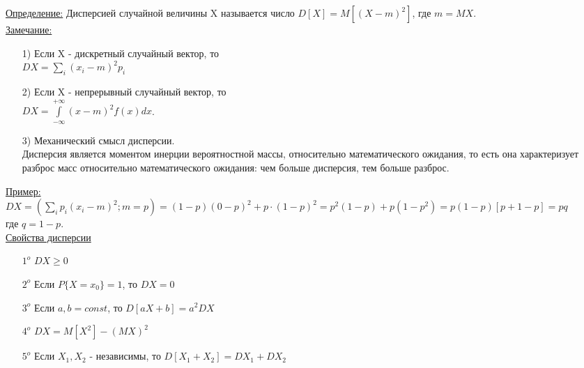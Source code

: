 

\underline{Определение:} Дисперсией случайной величины X называется число $D[X] = M\left[ (X-m)^2 \right]$, где $m = MX$.\\

\underline{Замечание:}
\begin{enumerate}
	\item[1)] Если X - дискретный случайный вектор, то\\
	$DX = \sum\limits_i (x_i - m)^2 p_i$
	
	\item[2)] Если X - непрерывный случайный вектор, то\\
	$\displaystyle  DX = \int\limits_{-\infty}^{+\infty} (x - m)^2 f(x) dx$.
	
	\item[3)] Механический смысл дисперсии.\\
	Дисперсия является моментом инерции вероятностной массы, относительно математического ожидания, то есть она характеризует разброс масс относительно математического ожидания: чем больше дисперсия, тем больше разброс.\\
\end{enumerate}


\underline{Пример:} \\
$DX = \left( \sum\limits_i p_i (x_i - m)^2; m = p\right) = (1 - p)(0 - p)^2 + p \cdot (1 - p)^2 = p^2 (1 - p) + p(1 - p^2) =  p(1 - p)[p + 1 - p] = pq$ \\
где $q = 1 - p$.\\


\underline{Свойства дисперсии}
\begin{enumerate}
	\item[$1^o$] $DX \geqslant 0$
	
	\item[$2^o$] Если $P\{X = x_0\} = 1$, то $DX = 0$
	
	\item[$3^o$] Если $a,b = const$, то $D[aX + b] = a^2 DX$
	
	\item[$4^o$] $DX = M[X^2] - (MX)^2$
	
	\item[$5^o$] Если $X_1, X_2$ - независимы, то $D[X_1 + X_2] = DX_1 + DX_2$
\end{enumerate}



